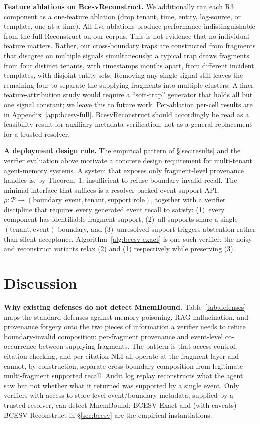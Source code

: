 \documentclass[conference,compsoc]{IEEEtran}
\begin{document}
\textbf{Feature ablations on BcesvReconstruct.}
We additionally ran each R3 component as a one-feature ablation (drop tenant, time, entity, log-source, or template, one at a time). All five ablations produce performance indistinguishable from the full Reconstruct on our corpus. This is not evidence that no individual feature matters. Rather, our cross-boundary traps are constructed from fragments that disagree on multiple signals simultaneously: a typical trap draws fragments from four distinct tenants, with timestamps months apart, from different incident templates, with disjoint entity sets. Removing any single signal still leaves the remaining four to separate the supplying fragments into multiple clusters. A finer feature-attribution study would require a ``soft-trap'' generator that holds all but one signal constant; we leave this to future work. Per-ablation per-cell results are in Appendix~\ref{app:bcesv-full}. BcesvReconstruct should accordingly be read as a feasibility result for auxiliary-metadata verification, not as a general replacement for a trusted resolver.

\textbf{A deployment design rule.}
The empirical pattern of \S\ref{sec:results} and the verifier evaluation above motivate a concrete design requirement for multi-tenant agent-memory systems. A system that exposes only fragment-level provenance handles is, by Theorem~1, insufficient to refuse boundary-invalid recall. The minimal interface that suffices is a resolver-backed event-support API, $\rho: \mathcal{P} \to (\mathrm{boundary},\mathrm{event},\mathrm{tenant},\mathrm{support\_role})$, together with a verifier discipline that requires every generated event recall to satisfy: (1)~every component has identifiable fragment support, (2)~all supports share a single $(\mathrm{tenant},\mathrm{event})$ boundary, and (3)~unresolved support triggers abstention rather than silent acceptance. Algorithm~\ref{alg:bcesv-exact} is one such verifier; the noisy and reconstruct variants relax (2) and (1) respectively while preserving (3).

\section{Discussion}\label{sec:discussion}

\textbf{Why existing defenses do not detect MnemBound.}
Table~\ref{tab:defenses} maps the standard defenses against memory-poisoning, RAG hallucination, and provenance forgery onto the two pieces of information a verifier needs to refute boundary-invalid composition: per-fragment provenance and event-level co-occurrence between supplying fragments. The pattern is that access control, citation checking, and per-citation NLI all operate at the fragment layer and cannot, by construction, separate cross-boundary composition from legitimate multi-fragment supported recall. Audit log replay reconstructs what the agent saw but not whether what it returned was supported by a single event. Only verifiers with access to store-level event/boundary metadata, supplied by a trusted resolver, can detect MnemBound; BCESV-Exact and (with caveats) BCESV-Reconstruct in \S\ref{sec:bcesv} are the empirical instantiations.
\end{document}
